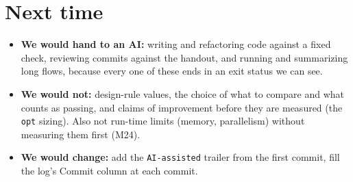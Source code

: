 \documentclass[10pt,a4paper]{article}
\newcommand{\code}[1]{\texttt{#1}}
\begin{document}
\section{Next time}
\begin{itemize}
\item \textbf{We would hand to an AI:} writing and refactoring code against a fixed check, reviewing commits against the handout, and running and summarizing long flows, because every one of these ends in an exit status we can see.
\item \textbf{We would not:} design-rule values, the choice of what to compare and what counts as passing, and claims of improvement before they are measured (the \code{opt} sizing). Also not run-time limits (memory, parallelism) without measuring them first (M24).
\item \textbf{We would change:} add the \code{AI-assisted} trailer from the first commit, fill the log's Commit column at each commit. 
\end{itemize}
\end{document}
